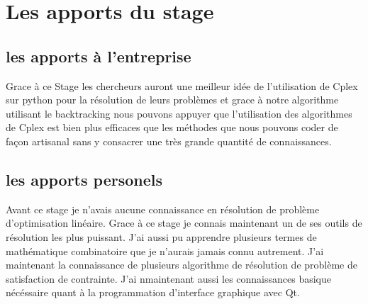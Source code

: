 \section{Les apports du stage}

\subsection{les apports à l'entreprise}
Grace à ce Stage les chercheurs auront une meilleur idée de l'utilisation de Cplex sur python pour la résolution de leurs problèmes et grace à notre algorithme utilisant le backtracking nous pouvons appuyer que l'utilisation des algorithmes de Cplex est bien plus efficaces que les méthodes que nous pouvons coder de façon artisanal sans y consacrer une très grande quantité de connaissances.

\subsection{les apports personels}

Avant ce stage je n'avais aucune connaissance en résolution de problème d'optimisation linéaire. Grace à ce stage je connais maintenant un de ses outils de résolution les plus puissant. J'ai aussi pu apprendre plusieurs termes de mathématique combinatoire que je n'aurais jamais connu autrement. J'ai maintenant la connaissance de plusieurs algorithme de résolution de problème de satisfaction de contrainte. J'ai nmaintenant aussi les connaissances basique nécéssaire quant à la programmation d'interface graphique avec Qt.
